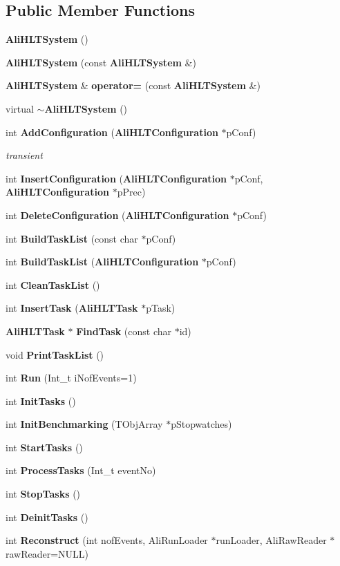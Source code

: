 \subsection*{Public Member Functions}
\begin{CompactItemize}
\item 
{\bf Ali\-HLTSystem} ()
\item 
{\bf Ali\-HLTSystem} (const {\bf Ali\-HLTSystem} \&)
\item 
{\bf Ali\-HLTSystem} \& {\bf operator=} (const {\bf Ali\-HLTSystem} \&)
\item 
virtual {\bf $\sim$Ali\-HLTSystem} ()
\item 
int {\bf Add\-Configuration} ({\bf Ali\-HLTConfiguration} $\ast$p\-Conf)
\begin{CompactList}\small\item\em transient \item\end{CompactList}\item 
int {\bf Insert\-Configuration} ({\bf Ali\-HLTConfiguration} $\ast$p\-Conf, {\bf Ali\-HLTConfiguration} $\ast$p\-Prec)
\item 
int {\bf Delete\-Configuration} ({\bf Ali\-HLTConfiguration} $\ast$p\-Conf)
\item 
int {\bf Build\-Task\-List} (const char $\ast$p\-Conf)
\item 
int {\bf Build\-Task\-List} ({\bf Ali\-HLTConfiguration} $\ast$p\-Conf)
\item 
int {\bf Clean\-Task\-List} ()
\item 
int {\bf Insert\-Task} ({\bf Ali\-HLTTask} $\ast$p\-Task)
\item 
{\bf Ali\-HLTTask} $\ast$ {\bf Find\-Task} (const char $\ast$id)
\item 
void {\bf Print\-Task\-List} ()
\item 
int {\bf Run} (Int\_\-t i\-Nof\-Events=1)
\item 
int {\bf Init\-Tasks} ()
\item 
int {\bf Init\-Benchmarking} (TObj\-Array $\ast$p\-Stopwatches)
\item 
int {\bf Start\-Tasks} ()
\item 
int {\bf Process\-Tasks} (Int\_\-t event\-No)
\item 
int {\bf Stop\-Tasks} ()
\item 
int {\bf Deinit\-Tasks} ()
\item 
int {\bf Reconstruct} (int nof\-Events, Ali\-Run\-Loader $\ast$run\-Loader, Ali\-Raw\-Reader $\ast$raw\-Reader=NULL)

\end{CompactItemize}
